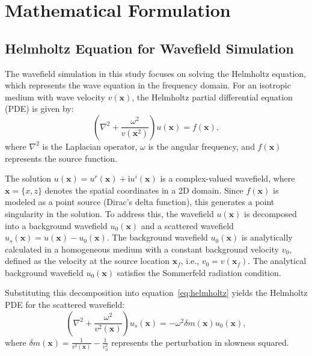 \documentclass[authoryear, preprint, 12pt]{elsarticle}
\begin{document}
	
	\section{Mathematical Formulation}
	
	\subsection{Helmholtz Equation for Wavefield Simulation}
	
	The wavefield simulation in this study focuses on solving the Helmholtz equation, which represents the wave equation in the frequency domain. For an isotropic medium with wave velocity \( v(\mathbf{x}) \), the Helmholtz partial differential equation (PDE) is given by:
	\begin{equation}
		\left(\nabla^2 + \frac{\omega^2}{v(\mathbf{x}^2)}\right) u(\mathbf{x}) = f(\mathbf{x}),
		\label{eq:helmholtz}
	\end{equation}
	where \( \nabla^2 \) is the Laplacian operator, \( \omega \) is the angular frequency, and \( f(\mathbf{x}) \) represents the source function.
	
	The solution $u(\mathbf{x}) = u^r(\mathbf{x}) + \mathrm{i} u^i(\mathbf{x})$  is a complex-valued wavefield, where \( \mathbf{x} = \{x, z\} \) denotes the spatial coordinates in a 2D domain. Since $f(\mathbf{x})$ is modeled as a point source (Dirac's delta function), this generates a point singularity in the solution. To address this, the wavefield $u(\mathbf{x})$ is decomposed into a background wavefield $u_0(\mathbf{x})$ and a scattered wavefield $u_s(\mathbf{x}) = u(\mathbf{x}) - u_0(\mathbf{x})$. The background wavefield \( u_0(\mathbf{x}) \) is analytically calculated in a homogeneous medium with a constant background velocity \( v_0 \), defined as the velocity at the source location \( \mathbf{x}_f \), i.e., \( v_0 = v(\mathbf{x}_f) \). The analytical background wavefield \( u_0(\mathbf{x}) \) satisfies the Sommerfeld radiation condition.
	
	Substituting this decomposition into equation~\ref {eq:helmholtz} yields the Helmholtz PDE for the scattered wavefield:
	\begin{equation}
	\left(\nabla^2 + \frac{\omega^2}{v^2(\mathbf{x})}\right) u_s(\mathbf{x}) = -\omega^2 \delta m(\mathbf{x}) u_0(\mathbf{x}),
\end{equation}
where $\delta m(\mathbf{x}) = \frac{1}{v^2(\mathbf{x})} - \frac{1}{v_0^2}$ represents the perturbation in slowness squared.
\end{document}
